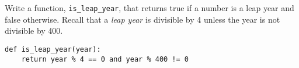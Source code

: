 \begin{blocksection}
\question Write a function, \lstinline$is_leap_year$, that returns true if a number is a leap year and false otherwise.
Recall that a \emph{leap year} is divisible by 4 unless the year is not divisible by 400.

\begin{solution}[1.5in]
\begin{lstlisting}
def is_leap_year(year):
    return year % 4 == 0 and year % 400 != 0
\end{lstlisting}
\end{solution}
\end{blocksection}
